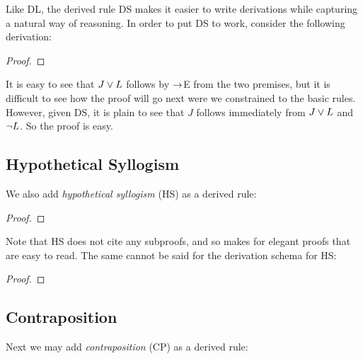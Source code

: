 Like DL, the derived rule DS makes it easier to write derivations while capturing a natural way of reasoning.
In order to put DS to work, consider the following derivation:


\begin{proof}
	  
	 
	 
\end{proof}

It is easy to see that $J\vee L$ follows by $\rightarrow$E from the two premises, but it is difficult to see how the proof will go next were we constrained to the basic rules.
However, given DS, it is plain to see that $J$ follows immediately from $J\vee L$ and $\neg L$. 
So the proof is easy.





\subsection{Hypothetical Syllogism}

We also add \textit{hypothetical syllogism} (HS) as a derived rule:

\begin{proof}
\end{proof}

Note that HS does not cite any subproofs, and so makes for elegant proofs that are easy to read.
The same cannot be said for the derivation schema for HS:

\begin{proof}
  \open 
     \as{}
     
     
  \close
   
\end{proof}


\subsection{Contraposition}
  \label{derived:CP}

Next we may add \textit{contraposition} (CP) as a derived rule:

